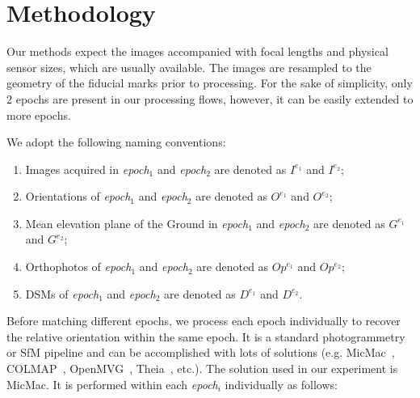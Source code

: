 
\section{Methodology}
Our methods expect the images accompanied with focal lengths and physical sensor sizes, which are usually available. The images are resampled to the geometry of the fiducial marks prior to processing. For the sake of simplicity, only 2 epochs are present in our processing flows, however, it can be easily extended to more epochs.
\par
We adopt the following naming conventions:\\
\begin{enumerate}
    \item Images acquired in \textit{epoch$_1$} and \textit{epoch$_2$} are denoted as $I^{e_1}$ and $I^{e_2}$;
    \item Orientations of \textit{epoch$_1$} and \textit{epoch$_2$} are denoted as $O^{e_1}$ and $O^{e_2}$; 
    \item Mean elevation plane of the Ground in \textit{epoch$_1$} and \textit{epoch$_2$} are denoted as $G^{e_1}$ and $G^{e_2}$;
    \item Orthophotos of \textit{epoch$_1$} and \textit{epoch$_2$} are denoted as $Op^{e_1}$ and $Op^{e_2}$; 
    \item DSMs of \textit{epoch$_1$} and \textit{epoch$_2$} are denoted as $D^{e_1}$ and $D^{e_2}$.
\end{enumerate}
\par
Before matching different epochs, we process each epoch individually to recover the relative orientation within the same epoch. It is a standard photogrammetry or SfM pipeline and can be accomplished with lots of solutions (e.g. MicMac~\cite{deseilligny2011apero}, COLMAP~\cite{schonberger2016structure}, {OpenMVG~\cite{openMVG}, Theia~\cite{theia}, etc.}). The solution used in our experiment is MicMac. It is performed within each \textit{epoch$_i$} individually as follows:
